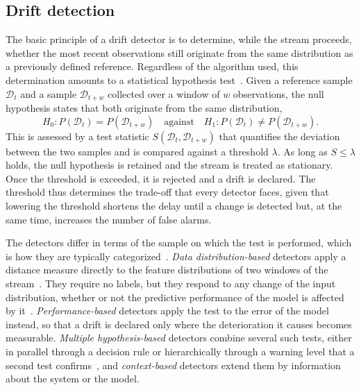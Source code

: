 \subsection{Drift detection} \label{subsec:detection}
%
The basic principle of a drift detector is to determine, while the stream proceeds, whether the most recent observations still originate from the same distribution as a previously defined reference. Regardless of the algorithm used, this determination amounts to a statistical hypothesis test~\cite{bayram.2022a}. Given a reference sample $\mathcal{D}_t$ and a sample $\mathcal{D}_{t+w}$ collected over a window of $w$ observations, the null hypothesis states that both originate from the same distribution,
%
\begin{equation} \label{eq:drift_hypothesis}
    H_0: P(\mathcal{D}_t) = P(\mathcal{D}_{t+w}) \quad \text{against} \quad
    H_1: P(\mathcal{D}_t) \neq P(\mathcal{D}_{t+w}).
\end{equation}
%
This is assessed by a test statistic $S(\mathcal{D}_t, \mathcal{D}_{t+w})$ that quantifies the deviation between the two samples and is compared against a threshold $\lambda$. As long as $S \leq \lambda$ holds, the null hypothesis is retained and the stream is treated as stationary. Once the threshold is exceeded, it is rejected and a drift is declared. The threshold thus determines the trade-off that every detector faces, given that lowering the threshold shortens the delay until a change is detected but, at the same time, increases the number of false alarms. \par
%
The detectors differ in terms of the sample on which the test is performed, which is how they are typically categorized~\cite{bayram.2022a}. \emph{Data distribution-based} detectors apply a distance measure directly to the feature distributions of two windows of the stream~\cite{kifer.2004}. They require no labels, but they respond to any change of the input distribution, whether or not the predictive performance of the model is affected by it~\cite{gama.2014}. \emph{Performance-based} detectors apply the test to the error of the model instead, so that a drift is declared only where the deterioration it causes becomes measurable. \emph{Multiple hypothesis-based} detectors combine several such tests, either in parallel through a decision rule or hierarchically through a warning level that a second test confirms~\cite{lu.2018}, and \emph{context-based} detectors extend them by information about the system or the model. \par
%
